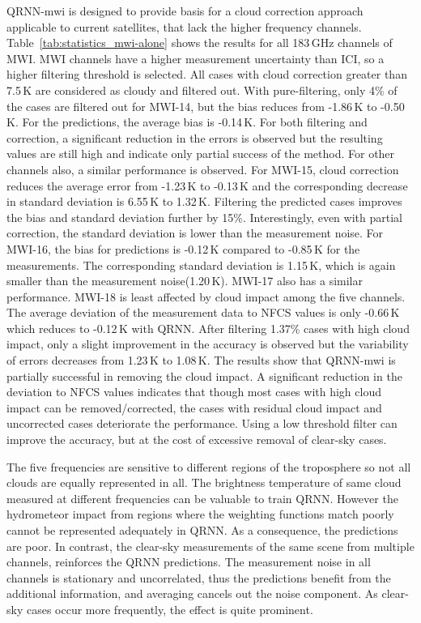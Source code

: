 \documentclass[amt, manuscript]{copernicus}
\begin{document}
QRNN-mwi is designed to provide basis for a cloud correction approach applicable to current satellites, that lack the higher frequency channels. Table~\ref{tab:statistics_mwi-alone} shows the results for all 183\,GHz channels of MWI. MWI channels have a higher measurement uncertainty than ICI, so a higher filtering threshold is selected. All cases with cloud correction greater than 7.5\,K are considered as cloudy and filtered out. With pure-filtering, only 4\% of the cases are filtered out for MWI-14, but the bias reduces from -1.86\,K to -0.50\,K. For the predictions, the average bias is -0.14\,K. For both filtering and correction, a significant reduction in the errors is observed but the resulting values are still high and indicate only partial success of the method. For other channels also, a similar performance is observed.  For MWI-15, cloud correction reduces the average error from -1.23\,K to -0.13\,K  and the corresponding decrease in standard deviation is 6.55\,K to 1.32\,K. Filtering the predicted cases improves the bias and standard deviation further by 15\%. Interestingly, even with partial correction, the standard deviation is lower than the measurement noise. For MWI-16, the bias for predictions is -0.12\,K compared to -0.85\,K for the measurements. The corresponding standard deviation is  1.15\,K, which is again smaller than the measurement noise(1.20\,K). MWI-17 also has a similar performance. MWI-18 is least affected by cloud impact among the five channels. The average deviation of the measurement data to NFCS values is only -0.66\,K which reduces to -0.12\,K with QRNN. After filtering 1.37\% cases with high cloud impact, only a slight improvement in the accuracy is observed but the variability of errors decreases from 1.23\,K to 1.08\,K. The results show that QRNN-mwi is partially successful in removing the cloud impact. A significant reduction in the deviation to NFCS values indicates that though most cases with high cloud impact can be removed/corrected, the cases with residual cloud impact and uncorrected cases deteriorate the performance. Using a low threshold filter can improve the accuracy, but at the cost of excessive removal of clear-sky cases. 

The five frequencies are sensitive to different regions of the troposphere so not all clouds are equally represented in all. The brightness temperature of same cloud measured at different frequencies can be valuable to train QRNN. However the hydrometeor impact from regions where the weighting functions match poorly cannot be represented adequately in QRNN. As a consequence, the predictions are poor. In contrast, the clear-sky measurements of the same scene from multiple channels, reinforces the QRNN predictions. The measurement noise in all channels is stationary and uncorrelated, thus the predictions benefit from the additional information, and averaging cancels out the noise component. As clear-sky cases occur more frequently, the effect is quite prominent.
\end{document}
